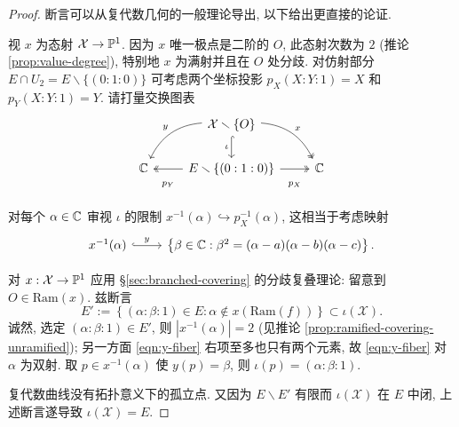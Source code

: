 \begin{proof}
	断言可以从复代数几何的一般理论导出, 以下给出更直接的论证.

	视 $x$ 为态射 $\mathcal{X} \to \mathbb{P}^1$. 因为 $x$ 唯一极点是二阶的 $O$, 此态射次数为 $2$ (推论 \ref{prop:value-degree}), 特别地 $x$ 为满射并且在 $O$ 处分歧. 对仿射部分 $E \cap U_2 = E \smallsetminus \{(0:1:0)\}$ 可考虑两个坐标投影 $p_X(X:Y:1) = X$ 和 $p_Y(X:Y:1) = Y$. 请打量交换图表
	\[\begin{tikzcd}
		& \mathcal{X} \smallsetminus \{O\} \arrow[hookrightarrow, d, "\iota"'] \arrow[ld, bend right, "y"'] \arrow[twoheadrightarrow, bend left, rd, "x"] & \\
		\CC & E \smallsetminus \{(0:1:0)\} \arrow[twoheadrightarrow, r, "p_X"' inner sep=1em] \arrow[twoheadrightarrow, l, "p_Y" inner sep=1em] & \CC
	\end{tikzcd}\]
	对每个 $\alpha \in \mathbb{C}$ 审视 $\iota$ 的限制 $x^{-1}(\alpha) \hookrightarrow p_X^{-1}(\alpha)$, 这相当于考虑映射
	\begin{equation} \label{eqn:y-fiber}\begin{tikzcd}
		x^{-1}(\alpha) \arrow[hookrightarrow, r, "y"] & \left\{ \beta \in \CC: \beta^2 = (\alpha - a)(\alpha - b)(\alpha - c) \right\} .
	\end{tikzcd}\end{equation}

	对 $x: \mathcal{X} \to \mathbb{P}^1$ 应用 \S\ref{sec:branched-covering} 的分歧复叠理论: 留意到 $O \in \mathrm{Ram}(x)$. 兹断言
	\[ E' := \left\{ (\alpha:\beta:1) \in E: \alpha \notin x(\mathrm{Ram}(f)) \right\} \subset \iota(\mathcal{X}). \]
	诚然, 选定 $(\alpha:\beta:1) \in E'$, 则 $|x^{-1}(\alpha)| = 2$ (见推论 \ref{prop:ramified-covering-unramified}); 另一方面 \eqref{eqn:y-fiber} 右项至多也只有两个元素, 故 \eqref{eqn:y-fiber} 对 $\alpha$ 为双射. 取 $p \in x^{-1}(\alpha)$ 使 $y(p) = \beta$, 则 $\iota(p) = (\alpha:\beta:1)$.


	复代数曲线没有拓扑意义下的孤立点. 又因为 $E \smallsetminus E'$ 有限而 $\iota(\mathcal{X})$ 在 $E$ 中闭, 上述断言遂导致 $\iota(\mathcal{X}) = E$.


\end{proof}

